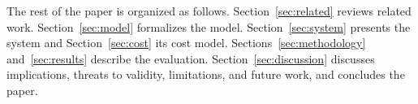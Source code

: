 The rest of the paper is organized as follows. Section~\ref{sec:related} reviews related work. Section~\ref{sec:model} formalizes the model. Section~\ref{sec:system} presents the system and Section~\ref{sec:cost} its cost model. Sections~\ref{sec:methodology} and~\ref{sec:results} describe the evaluation. Section~\ref{sec:discussion} discusses implications, threats to validity, limitations, and future work, and concludes the paper.
